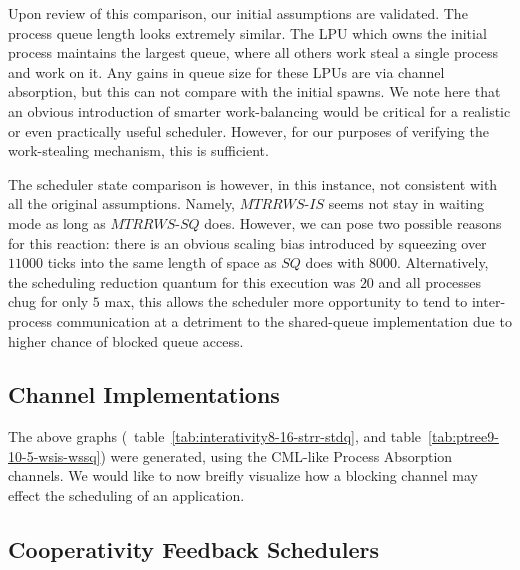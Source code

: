 Upon review of this comparison, our initial assumptions are validated. The process queue
length looks extremely similar. The LPU which owns the initial process maintains the 
largest queue, where all others work steal a single process and work on it. Any gains in
queue size for these LPUs are via channel absorption, but this can not compare with the
initial spawns. We note here that an obvious introduction of smarter work-balancing
would be critical for a realistic or even practically useful scheduler. However, for our
purposes of verifying the work-stealing mechanism, this is sufficient.

The scheduler state comparison is however, in this instance, not consistent with all
the original assumptions. Namely, $MTRRWS$-$IS$ seems not stay in waiting mode as long
as $MTRRWS$-$SQ$ does. However, we can pose two possible reasons for this reaction:
there is an obvious scaling bias introduced by squeezing over $11000$ ticks into the same length
of space as $SQ$ does with $8000$. Alternatively, the scheduling reduction quantum for 
this execution was $20$ and all processes chug for only $5$ max, this allows the 
scheduler more opportunity to tend to inter-process communication at a detriment to
the shared-queue implementation due to higher chance of blocked queue access.

\subsection{Channel Implementations}\label{sec:results-channel-implementations}

The above graphs (\eg~table~\ref{tab:interativity8-16-strr-stdq}, and 
table~\ref{tab:ptree9-10-5-wsis-wssq}) were generated, using the CML-like Process 
Absorption channels. We would like to now breifly visualize how a blocking channel
may effect the scheduling of an application.

\subsection{Cooperativity Feedback Schedulers}\label{sec:results-evaluation-feedback}



